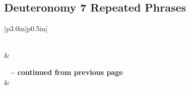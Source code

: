 \subsection{Deuteronomy 7 Repeated Phrases}


\normalsize
 
\begin{center}
\begin{longtable}{|p{3.0in}|p{0.5in}|}
\caption[Deuteronomy 7 Repeated Phrases]{Deuteronomy 7 Repeated Phrases}\label{table:Repeated Phrases Deuteronomy 7} \\
\hline {} &  \\ \hline 
\endfirsthead
 
{{\bfseries \tablename\ \thetable{} -- continued from previous page}} \\  
\hline {} &  \\ \hline 
\endhead
 

\end{longtable}
\end{center}
